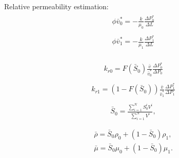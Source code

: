 \documentclass[a4paper,12pt]{extreport}
\begin{document}
Relative permeability estimation:
\begin{eqnarray}
	\label{eq:single_0_velocity}
	\begin{gathered}
		\phi \bar{v}_0^*  = -\frac{k}{\mu_0} \frac{\Delta P_0^*}{\Delta L}
	\end{gathered}
\end{eqnarray}
\begin{eqnarray}
	\label{eq:single_1_velocity}
	\begin{gathered}
		\phi \bar{v}_1^*  = -\frac{k}{\mu_1} \frac{\Delta P_1^*}{\Delta L}
	\end{gathered}
\end{eqnarray}

\begin{eqnarray}
	\label{eq:rel_0}
	\begin{gathered}
		k_{r0}=F\left(\bar{S}_0\right)\frac{\bar{v}}{\bar{v}_0^*} \frac{\Delta P_{0}^*}{\Delta P_0}
	\end{gathered}
\end{eqnarray}
\begin{eqnarray}
	\label{eq:rel_1}
	\begin{gathered}
		k_{r1}=\left(1-F\left(\bar{S}_0\right)\right)\frac{\bar{v}}{\bar{v}_1^*} \frac{\Delta P_{1}^*}{\Delta P_1}
	\end{gathered}
\end{eqnarray}
\begin{eqnarray}
	\label{eq:sat_av}
	\begin{gathered}
		\bar{S}_0 = \frac{\sum_{i=1}^N S_{0}^i V^i}{\sum_{i=1}^N V^i}, \\
	\end{gathered}
\end{eqnarray}
\begin{eqnarray}
	\label{eq:twophase_dens_visc_model}
	\begin{gathered}
		\bar{\rho} = \bar{S}_{0} \rho_0+ \left(1-\bar{S}_0\right) \rho_1, \\
		\bar{\mu} = \bar{S}_{0} \mu_0+ \left(1-\bar{S}_0\right) \mu_1. \\
	\end{gathered}
\end{eqnarray}
\end{document}
